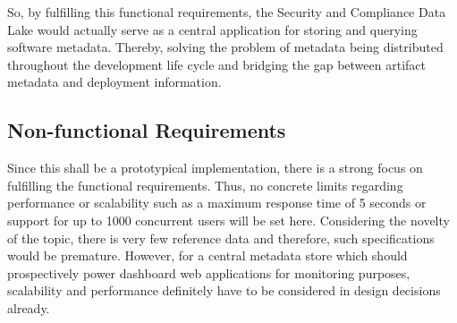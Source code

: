 So, by fulfilling this functional requirements, the Security and Compliance Data Lake would actually serve as a central application for storing and querying software metadata. Thereby, solving the problem of metadata being distributed throughout the development life cycle and bridging the gap between artifact metadata and deployment information.

\subsection{Non-functional Requirements}
Since this shall be a prototypical implementation, there is a strong focus on fulfilling the functional requirements. Thus, no concrete limits regarding performance or scalability such as a maximum response time of 5 seconds or support for up to 1000 concurrent users will be set here. Considering the novelty of the topic, there is very few reference data and therefore, such specifications would be premature. However, for a central metadata store which should prospectively power dashboard web applications for monitoring purposes, scalability and performance definitely have to be considered in design decisions already.

